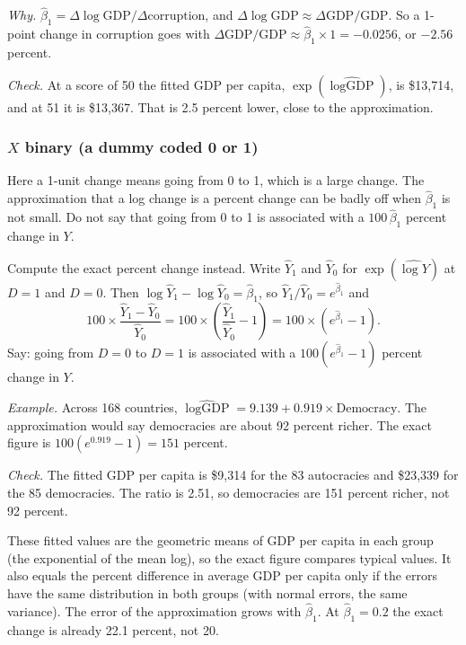 \documentclass[11pt]{article}
\begin{document}
\emph{Why.} $\hat\beta_1 = \Delta \log \text{GDP} / \Delta\text{corruption}$, and
$\Delta \log \text{GDP} \approx \Delta\text{GDP}/\text{GDP}$. So a 1-point change in corruption goes
with $\Delta\text{GDP}/\text{GDP} \approx \hat\beta_1 \times 1 = -0.0256$, or $-2.56$ percent.

\emph{Check.} At a score of 50 the fitted GDP per capita, $\exp(\widehat{\log \text{GDP}})$, is
\$13,714, and at 51 it is \$13,367. That is 2.5 percent lower, close to the approximation.

\subsubsection*{$X$ binary (a dummy coded 0 or 1)}\label{sec:binary}

Here a 1-unit change means going from 0 to 1, which is a large change. The approximation that a log
change is a percent change can be badly off when $\hat\beta_1$ is not small. Do not say that going
from 0 to 1 is associated with a $100\,\hat\beta_1$ percent change in $Y$.

Compute the exact percent change instead. Write $\hat Y_1$ and $\hat Y_0$ for
$\exp(\widehat{\log Y})$ at $D = 1$ and $D = 0$. Then $\log \hat Y_1 - \log \hat Y_0 = \hat\beta_1$, so
$\hat Y_1/\hat Y_0 = e^{\hat\beta_1}$ and
\[
100\times\frac{\hat Y_1 - \hat Y_0}{\hat Y_0} = 100\times\left(\frac{\hat Y_1}{\hat Y_0} - 1\right)
= 100\times\left(e^{\hat\beta_1}-1\right).
\]
Say: going from $D=0$ to $D=1$ is associated with a $100(e^{\hat\beta_1}-1)$ percent change in $Y$.

\emph{Example.} Across 168 countries, $\widehat{\log \text{GDP}} = 9.139 + 0.919\times\text{Democracy}$.
The approximation would say democracies are about 92 percent richer. The exact figure is
$100(e^{0.919}-1) = 151$ percent.

\emph{Check.} The fitted GDP per capita is \$9,314 for the 83 autocracies and \$23,339 for the 85
democracies. The ratio is 2.51, so democracies are 151 percent richer, not 92 percent.

These fitted values are the geometric means of GDP per capita in each group (the exponential of the
mean log), so the exact figure compares typical values. It also equals the percent difference in
average GDP per capita only if the errors have the same distribution in both groups (with normal
errors, the same variance). The error of the
approximation grows with $\hat\beta_1$. At $\hat\beta_1 = 0.2$ the exact change is already
22.1 percent, not 20.
\end{document}
